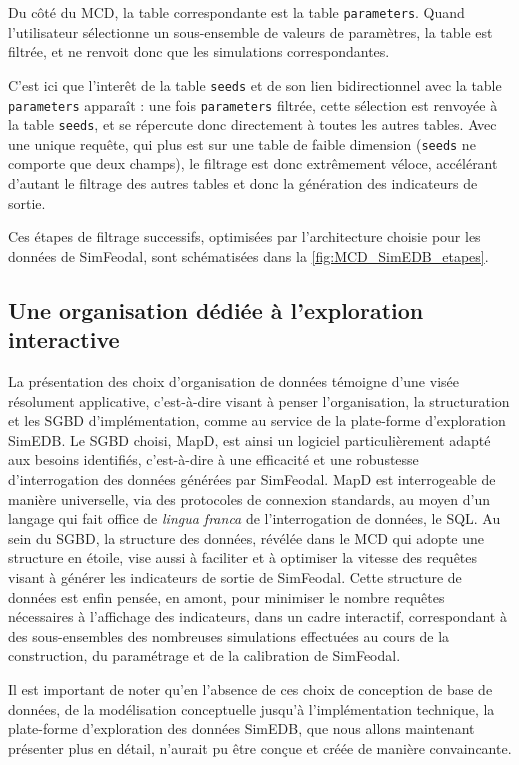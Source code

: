 		Du côté du MCD, la table correspondante est la table \texttt{parameters}. Quand l'utilisateur sélectionne un sous-ensemble de valeurs de paramètres, la table est filtrée, et ne renvoit donc que les simulations correspondantes.
		
		C'est ici que l'interêt de la table \texttt{seeds} et de son lien bidirectionnel avec la table \texttt{parameters} apparaît : une fois \texttt{parameters} filtrée, cette sélection est renvoyée à la table \texttt{seeds}, et se répercute donc directement à toutes les autres tables.
		Avec une unique requête, qui plus est sur une table de faible dimension (\texttt{seeds} ne comporte que deux champs), le filtrage est donc extrêmement véloce, accélérant d'autant le filtrage des autres tables et donc la génération des indicateurs de sortie.
		
		Ces étapes de filtrage successifs, optimisées par l'architecture choisie pour les données de SimFeodal, sont schématisées dans la \cref{fig:MCD_SimEDB_etapes}.

	
		\subsection*{Une organisation dédiée à l'exploration interactive}
		La présentation des choix d'organisation de données témoigne d'une visée résolument applicative, c'est-à-dire visant à penser l'organisation, la structuration et les SGBD d'implémentation, comme au service de la plate-forme d'exploration SimEDB.
		Le SGBD choisi, MapD, est ainsi un logiciel particulièrement adapté aux besoins identifiés, c'est-à-dire à une efficacité et une robustesse d'interrogation des données générées par SimFeodal.
		MapD est interrogeable de manière universelle, via des protocoles de connexion standards, au moyen d'un langage qui fait office de \textit{lingua franca} de l'interrogation de données, le SQL.
		Au sein du SGBD, la structure des données, révélée dans le MCD qui adopte une structure \og en étoile\fg{}, vise aussi à faciliter et à optimiser la vitesse des requêtes visant à générer les indicateurs de sortie de SimFeodal.
		Cette structure de données est enfin pensée, en amont, pour minimiser le nombre requêtes nécessaires à l'affichage des indicateurs, dans un cadre interactif, correspondant à des sous-ensembles des nombreuses simulations effectuées au cours de la construction, du paramétrage et de la calibration de SimFeodal.
		
		Il est important de noter qu'en l'absence de ces choix de conception de base de données, de la modélisation conceptuelle jusqu'à l'implémentation technique, la plate-forme d'exploration des données SimEDB, que nous allons maintenant présenter plus en détail, n'aurait pu être conçue et créée de manière convaincante.
		




